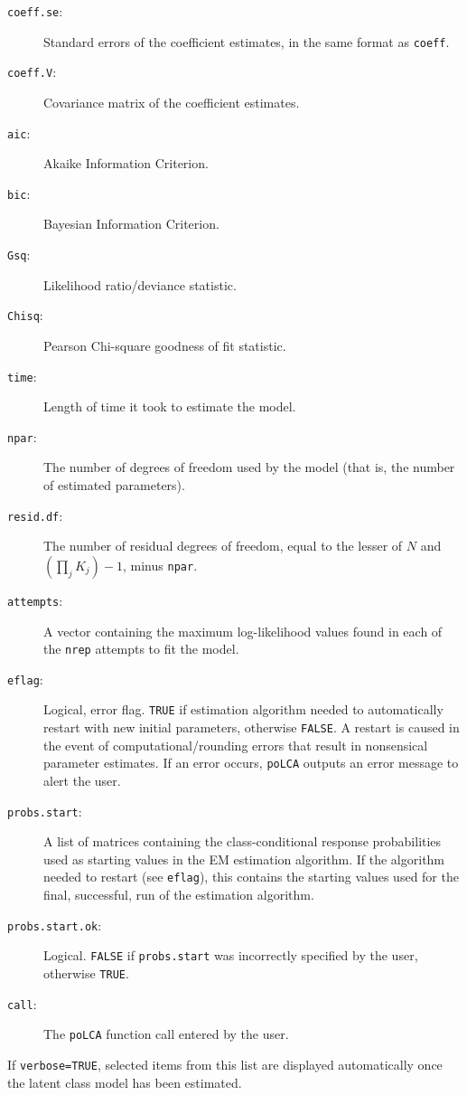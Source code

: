 \documentclass[letterpaper,12pt]{article}
\begin{document}
\begin{description}
    \item [\texttt{coeff.se}:] Standard errors of the coefficient estimates, in the same format as \texttt{coeff}.
    \item [\texttt{coeff.V}:] Covariance matrix of the coefficient estimates.
    \item [\texttt{aic}:] Akaike Information Criterion.
    \item [\texttt{bic}:] Bayesian Information Criterion.
    \item [\texttt{Gsq}:] Likelihood ratio/deviance statistic.
    \item [\texttt{Chisq}:] Pearson Chi-square goodness of fit statistic.
    \item [\texttt{time}:] Length of time it took to estimate the model.
    \item [\texttt{npar}:] The number of degrees of freedom used by the model (that is, the number of estimated parameters).
    \item [\texttt{resid.df}:] The number of residual degrees of freedom, equal to the lesser of $N$ and $(\prod_j K_j)-1$, minus \texttt{npar}.
    \item [\texttt{attempts}:] A vector containing the maximum log-likelihood values found in each of the \texttt{nrep} attempts to fit the model.
    \item [\texttt{eflag}:] Logical, error flag. \texttt{TRUE} if estimation algorithm needed to automatically restart with new initial parameters, otherwise \texttt{FALSE}.  A restart is caused in the event of computational/rounding errors that result in nonsensical parameter estimates. If an error occurs, \texttt{poLCA} outputs an error message to alert the user.
    \item [\texttt{probs.start}:] A list of matrices containing the class-conditional response probabilities used as starting values in the EM estimation algorithm.  If the algorithm needed to restart (see \texttt{eflag}), this contains the starting values used for the final, successful, run of the estimation algorithm.
    \item [\texttt{probs.start.ok}:] Logical. \texttt{FALSE} if \texttt{probs.start} was incorrectly specified by the user, otherwise \texttt{TRUE}.
    \item [\texttt{call}:] The \texttt{poLCA} function call entered by the user.
\end{description}
If \texttt{verbose=TRUE}, selected items from this list are displayed automatically once the latent class model has been estimated.
\end{document}
